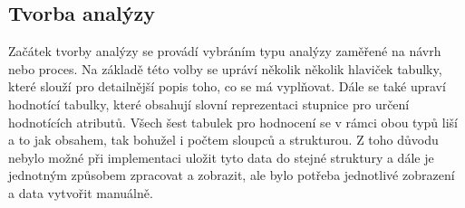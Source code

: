 \subsection{Tvorba analýzy}
Začátek tvorby analýzy se provádí vybráním typu analýzy zaměřené na návrh nebo proces. Na základě této volby se upráví několik několik hlaviček tabulky, které slouží pro detailnější popis toho, co se má vyplňovat. Dále se také upraví hodnotící tabulky, které obsahují slovní reprezentaci stupnice pro určení hodnotících atributů. Všech šest tabulek pro hodnocení se v rámci obou typů liší a to jak obsahem, tak bohužel i počtem sloupců a strukturou. Z toho důvodu nebylo možné při implementaci uložit tyto data do stejné struktury a dále je jednotným způsobem zpracovat a zobrazit, ale bylo potřeba jednotlivé zobrazení a data vytvořit manuálně. 

